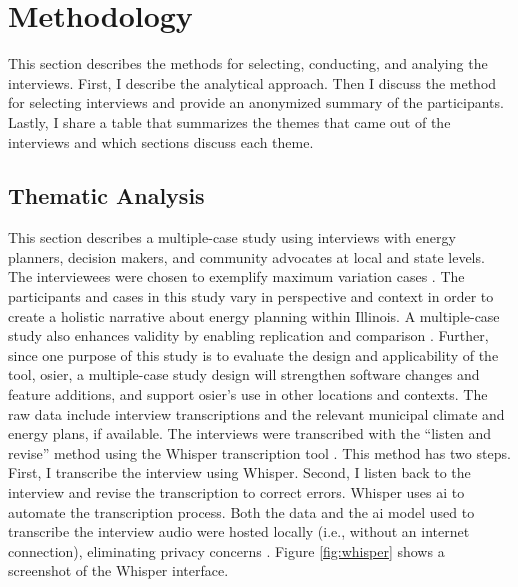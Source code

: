 \section{Methodology}
\label{section:interview-methods}

This section describes the methods for selecting, conducting, and analying the interviews.
First, I describe the analytical approach. Then I discuss the method for selecting interviews
and provide an anonymized summary of the participants. Lastly, I share a table that summarizes
the themes that came out of the interviews and which sections discuss each theme.


\subsection{Thematic Analysis}
This section describes a multiple-case study using interviews with energy
planners, decision makers, and community advocates at local and state levels.
The interviewees were chosen to exemplify maximum variation cases
\cite{flyvbjerg_five_2006}. The participants and cases in this study vary in
perspective and context in order to create a holistic narrative about energy
planning within Illinois. A multiple-case study also enhances validity by
enabling replication and comparison \cite{johannsen_designing_2021,
yin_case_2018}. Further, since one purpose of this study is to evaluate the
design and applicability of the tool, \ac{osier}, a multiple-case study design
will strengthen software changes and feature additions, and support \ac{osier}'s
use in other locations and contexts. The raw data include interview
transcriptions and the relevant municipal climate and energy plans, if
available. The interviews were transcribed with the ``listen and revise'' method
using the Whisper transcription tool \cite{battaglia_listen_2024}. This method has two steps. 
First, I transcribe the interview using Whisper. Second, I listen back to the interview and
revise the transcription to correct errors. Whisper uses
\ac{ai} to automate the transcription process. Both the data and the \ac{ai}
model used to transcribe the interview audio were hosted locally (i.e., without
an internet connection), eliminating privacy concerns
\cite{battaglia_listen_2024}. Figure \ref{fig:whisper} shows a screenshot of the
Whisper interface. 

